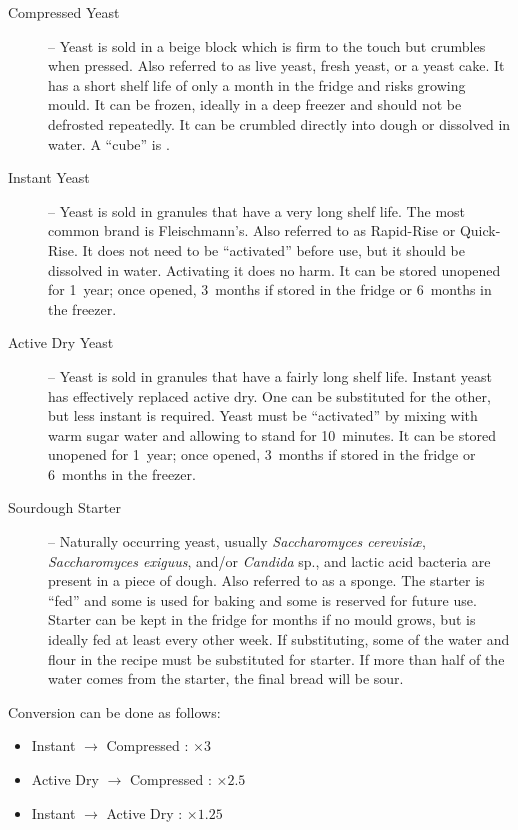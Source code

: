\begin{description}
\item[Compressed Yeast] -- Yeast is sold in a beige block which is firm to the touch but crumbles when pressed. Also referred to as live yeast, fresh yeast, or a yeast cake. It has a short shelf life of only a month in the fridge and risks growing mould. It can be frozen, ideally in a deep freezer and should not be defrosted repeatedly. It can be crumbled directly into dough or dissolved in water. A ``cube'' is .
\item[Instant Yeast] -- Yeast is sold in granules that have a very long shelf life. The most common brand is Fleischmann's. Also referred to as Rapid-Rise or Quick-Rise. It does not need to be ``activated'' before use, but it should be dissolved in water. Activating it does no harm. It can be stored unopened for 1~year; once opened, 3~months if stored in the fridge or 6~months in the freezer.
\item[Active Dry Yeast] -- Yeast is sold in granules that have a fairly long shelf life. Instant yeast has effectively replaced active dry. One can be substituted for the other, but less instant is required. Yeast must be ``activated'' by mixing with warm sugar water and allowing to stand for 10~minutes. It can be stored unopened for 1~year; once opened, 3~months if stored in the fridge or 6~months in the freezer.
\item[Sourdough Starter] -- Naturally occurring yeast, usually \textit{Saccharomyces cerevisi\ae}, \textit{Saccharomyces exiguus}, and/or \textit{Candida} sp.,  and lactic acid bacteria are present in a piece of dough. Also referred to as a sponge. The starter is ``fed'' and some is used for baking and some is reserved for future use. Starter can be kept in the fridge for months if no mould grows, but is ideally fed at least every other week. If substituting, some of the water and flour in the recipe must be substituted for starter. If more than half of the water comes from the starter, the final bread will be sour.
\end{description}

Conversion can be done as follows:

\begin{itemize}
\item Instant $\to$ Compressed : $\times 3$
\item Active Dry $\to$ Compressed : $\times 2.5$
\item Instant $\to$ Active Dry : $\times 1.25$
\end{itemize}

